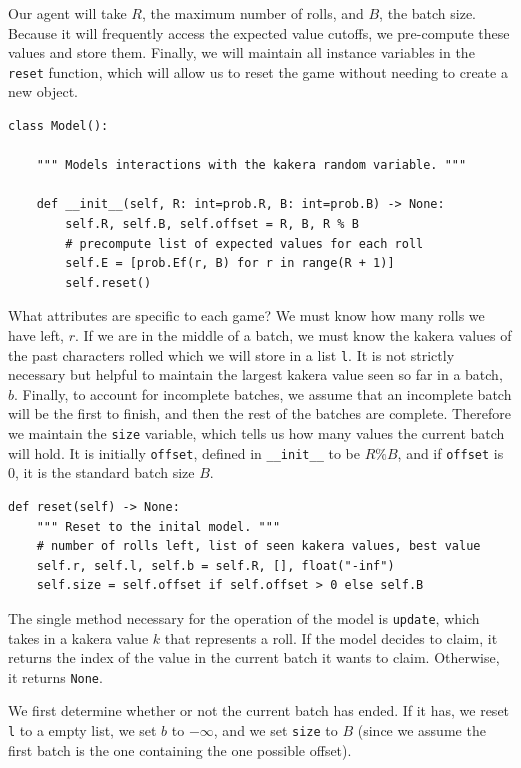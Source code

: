 \documentclass[11pt, oneside]{article}
\theoremstyle{plain}
\theoremstyle{definition}
\begin{document}
Our agent will take \( R \), the maximum number of rolls, and \( B \), the
batch size. Because it will frequently access the expected value cutoffs,
we pre-compute these values and store them. Finally, we will maintain all
instance variables in the \texttt{reset} function, which will allow us to
reset the game without needing to create a new object.
\begin{verbatim}
class Model():

    """ Models interactions with the kakera random variable. """

    def __init__(self, R: int=prob.R, B: int=prob.B) -> None:
        self.R, self.B, self.offset = R, B, R % B
        # precompute list of expected values for each roll
        self.E = [prob.Ef(r, B) for r in range(R + 1)]
        self.reset()
\end{verbatim}

What attributes are specific to each game? We must know how many rolls we have
left, \( r \). If we are in the middle of a batch, we must know the kakera
values of the past characters rolled which we will store in a list \texttt{l}.
It is not strictly necessary but helpful to maintain the largest kakera value
seen so far in a batch, \( b \). Finally, to account for incomplete batches, we
assume that an incomplete batch will be the first to finish, and then the rest
of the batches are complete. Therefore we maintain the \texttt{size} variable,
which tells us how many values the current batch will hold. It is initially
\texttt{offset}, defined in \texttt{__init__} to be \( R \% B \),
and if \texttt{offset} is 0, it is the standard batch size \( B \).
\begin{verbatim}
def reset(self) -> None:
    """ Reset to the inital model. """
    # number of rolls left, list of seen kakera values, best value
    self.r, self.l, self.b = self.R, [], float("-inf")
    self.size = self.offset if self.offset > 0 else self.B
\end{verbatim}

The single method necessary for the operation of the model is \texttt{update},
which takes in a kakera value \( k \) that represents a roll. If the model
decides to claim, it returns the index of the value in the current batch it
wants to claim. Otherwise, it returns \texttt{None}.

We first determine whether or not the current batch has ended. If
it has, we reset \texttt{l} to a empty list, we set \( b \) to \(
-\infty \), and we set \texttt{size} to \( B \) (since we assume
the first batch is the one containing the one possible offset).
\end{document}
